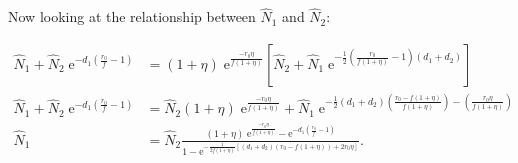 Now looking at the relationship between $\hat{N}_1$ and $\hat{N}_2$:

\begin{equation*}
\begin{split}
    \hat{N}_1 + \hat{N}_2 \; \text{e}^{-d_1 \left( \frac{r_0}{f} - 1 \right)} &=
        ( 1 + \eta) \; \text{e}^{\frac{ - r_0 \eta }{f (1 + \eta)}}
        \left[
            \hat{N}_2 + \hat{N}_1 \; \text{e}^{- \frac{1}{2}
            \left(
                \frac{r_0}{f (1 + \eta)} - 1
            \right) (d_1 + d_2)}
        \right] \\
    \hat{N}_1 + \hat{N}_2 \; \text{e}^{-d_1 \left( \frac{r_0}{f} - 1 \right)} &=
        \hat{N}_2 ( 1 + \eta) \; \text{e}^{\frac{ - r_0 \eta }{f (1 + \eta)}} +
        \hat{N}_1 \; \text{e}^{ - \frac{1}{2} (d_1 + d_2) \left(
            \frac{r_0 - f (1 + \eta)}{f (1 + \eta)} \right) -
            \left( \frac{r_0 \eta}{ f (1 + \eta) } \right)  } \\
    \hat{N}_1 &= \hat{N}_2 \frac{ ( 1 + \eta) \;
        \text{e}^{\frac{ - r_0 \eta }{f (1 + \eta)}} -
        \text{e}^{-d_1 \left( \frac{r_0}{f} - 1 \right)} }{
        1 - \text{e}^{ - \frac{1}{2 f (1 + \eta)} \left[ (d_1 + d_2)
        \left( r_0 - f (1 + \eta) \right) + 2 r_0 \eta \right]  } }
    \text{.}
\end{split}
\end{equation*}



